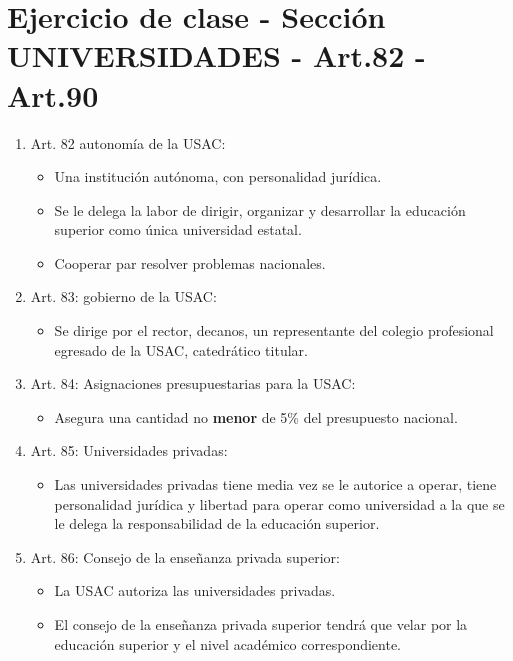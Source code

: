 \section{Ejercicio de clase - Sección UNIVERSIDADES - Art.82 - Art.90}
\begin{enumerate}
    \item Art. 82 autonomía de la USAC:  
        \begin{itemize}
            \item Una institución autónoma, con personalidad jurídica.
            \item Se le delega la labor de dirigir, organizar y desarrollar la educación superior como única universidad estatal.
            \item Cooperar par resolver problemas nacionales.
        \end{itemize}
    
    \item Art. 83: gobierno de la USAC: 
        \begin{itemize}
            \item Se dirige por el rector, decanos, un representante del colegio profesional egresado de la USAC, catedrático titular.
        \end{itemize}
    
    \item Art. 84: Asignaciones presupuestarias para la USAC: 
        \begin{itemize}
            \item Asegura una cantidad no \textbf{menor} de 5\% del presupuesto nacional.
        \end{itemize}
    
    \item Art. 85: Universidades privadas: 
        \begin{itemize}
            \item Las universidades privadas tiene media vez se le autorice a operar, tiene personalidad jurídica y libertad para operar como universidad a la que se le delega la responsabilidad de la educación superior.  
        \end{itemize}
    
    \item Art. 86: Consejo de la enseñanza privada superior: 
        \begin{itemize}
            \item La USAC autoriza las universidades privadas.
            \item El consejo de la enseñanza privada superior tendrá que velar por la educación superior y el nivel académico correspondiente.
        \end{itemize}
    

\end{enumerate}

